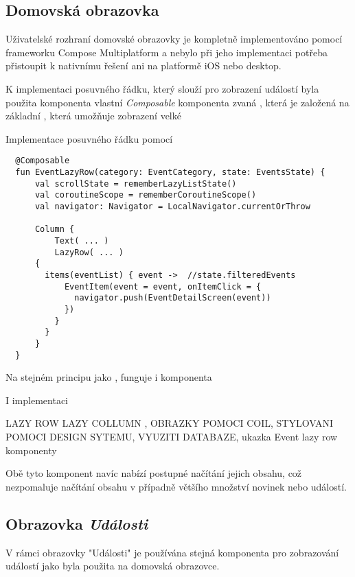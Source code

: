 \subsection{Domovská obrazovka}
Uživatelské rozhraní domovské obrazovky je kompletně implementováno pomocí frameworku Compose Multiplatform a nebylo při jeho implementaci potřeba
přistoupit k nativnímu řešení ani na platformě iOS nebo desktop.

K implementaci posuvného řádku, který slouží pro zobrazení událostí byla použita komponenta vlastní \textit{Composable} komponenta zvaná ,
která je založená na základní , která umožňuje zobrazení velké
\begin{listing}[H]
\caption{Implementace posuvného řádku pomocí }\label{lst:EventLazyRowImpl}
\begin{verbatim}
  @Composable
  fun EventLazyRow(category: EventCategory, state: EventsState) {
      val scrollState = rememberLazyListState()
      val coroutineScope = rememberCoroutineScope()
      val navigator: Navigator = LocalNavigator.currentOrThrow
  
      Column {
          Text( ... )
          LazyRow( ... ) 
      {  
        items(eventList) { event ->  //state.filteredEvents
            EventItem(event = event, onItemClick = {
              navigator.push(EventDetailScreen(event))
            })
          }
        }
      }
  }
\end{verbatim}
\end{listing}

Na stejném principu jako , funguje i komponenta 

I implementaci 

LAZY ROW LAZY COLLUMN , OBRAZKY POMOCI COIL, STYLOVANI POMOCI DESIGN SYTEMU, VYUZITI DATABAZE, ukazka Event lazy row komponenty

Obě tyto komponent navíc nabízí postupné načítání jejich obsahu, což nezpomaluje načítání obsahu v případně většího množství novinek
nebo událostí.

\subsection{Obrazovka \textit{Události}}

V rámci obrazovky "Události" je používána stejná komponenta pro zobrazování událostí jako byla použita na domovská obrazovce. 


